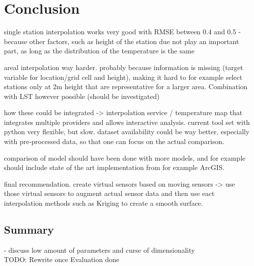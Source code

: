 \chapter{Conclusion}
\label{chap:Conclusion}

single station interpolation works very good with RMSE between 0.4 and 0.5
- because other factors, such as height of the station due not play an important part, as long as the distribution of the temperature is the same

areal interpolation way harder. probably because information is missing (target variable for location/grid cell and height), making it hard to for example select stations only at 2m height that are representative for a larger area. Combination with LST however possible (should be investigated)

how these could be integrated -> interpolation service / temperature map that integrates multiple providers and allows interactive analysis. current tool set with python very flexible, but slow. dataset availability could be way better, especially with pre-processed data, so that one can focus on the actual comparison.

comparison of model should have been done with more models, and for example should include state of the art implementation from for example ArcGIS. 

final recommendation. create virtual sensors based on moving sensors -> use those virtual sensors to augment actual sensor data and then use eact interpolation methods such as Kriging to create a smooth surface.  
\section{Summary}

- discuss low amount of parameters and curse of dimensionality\\

TODO: Rewrite once Evaluation done\\
\\

